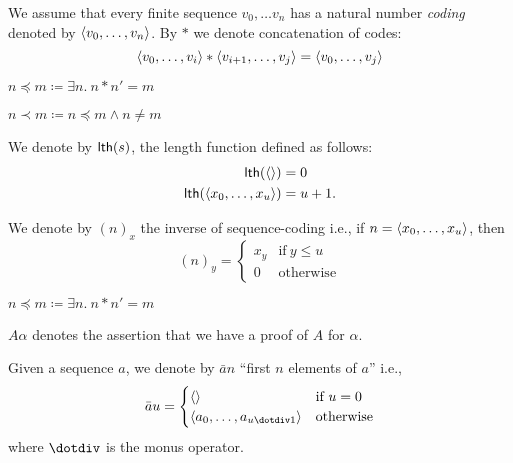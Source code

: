 \documentclass[11pt]{article}
\begin{document}
\begin{notation}
  We assume that every finite sequence $v_0, \dots v_n$ has a natural
  number \emph{coding} denoted by $\langle v_0, \dots, v_n \rangle$.
  By $*$ we denote concatenation of codes:
  \[ \langle v_0, \dots, v_i \rangle * \langle v_{i+1},  \dots, v_{j} \rangle =
      \langle v_0, \dots, v_j \rangle \]
\end{notation}

\begin{notation}
  $n \preceq m \coloneqq \exists n.\ n * n' = m$
\end{notation}

\begin{notation}
  $n \prec m \coloneqq n \preceq m \land n \neq m$
\end{notation}

\begin{notation}
  We denote by $\mathsf{lth}(s)$, the length function defined as follows:
  \begin{align*}
  \mathsf{lth}(\langle  \rangle) &= 0\\
  \mathsf{lth}(\langle x_0, \dots, x_u \rangle) &= u+1.
  \end{align*}
\end{notation}

\begin{notation}
  We denote by $(n)_x$ the inverse of sequence-coding i.e.,
  if $n = \langle x_0, \dots , x_u \rangle$, then
  \[ (n)_y =
       \begin{cases}
         x_y & \text{if}\ y \le u\\
         0   & \text{otherwise}
       \end{cases} \]
\end{notation}

\begin{notation}
  $n \preceq m \coloneqq \exists n.\ n * n' = m$
\end{notation}

\begin{notation}
  $A\alpha$ denotes the assertion that we have a proof of $A$ for $\alpha$.
\end{notation}

\begin{notation}
  Given a sequence $a$, we denote by $\bar{a}n$ ``first $n$ elements of $a$''
  i.e.,
  \[ \bar{a}u = \begin{cases}
      \seq{} & \text{if}\ u = 0\\
      \seq{a_0, \dots, a_{u \dotdiv 1}} & \text{otherwise}
      \end{cases} \]
  where $\dotdiv$ is the monus operator.
\end{notation}
\end{document}
